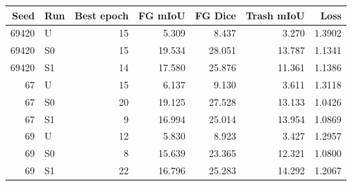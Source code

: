\begin{tabular}{@{}rlrrrrr@{}}\toprule
Seed & Run & Best epoch & FG mIoU & FG Dice & Trash mIoU & Loss \\ \midrule
69420 & U & 15 & 5.309 & 8.437 & 3.270 & 1.3902 \\
69420 & S0 & 15 & 19.534 & 28.051 & 13.787 & 1.1341 \\
69420 & S1 & 14 & 17.580 & 25.876 & 11.361 & 1.1386 \\
67 & U & 15 & 6.137 & 9.130 & 3.611 & 1.3118 \\
67 & S0 & 20 & 19.125 & 27.528 & 13.133 & 1.0426 \\
67 & S1 & 9 & 16.994 & 25.014 & 13.954 & 1.0869 \\
69 & U & 12 & 5.830 & 8.923 & 3.427 & 1.2957 \\
69 & S0 & 8 & 15.639 & 23.365 & 12.321 & 1.0800 \\
69 & S1 & 22 & 16.796 & 25.283 & 14.292 & 1.2067 \\
\bottomrule\end{tabular}
